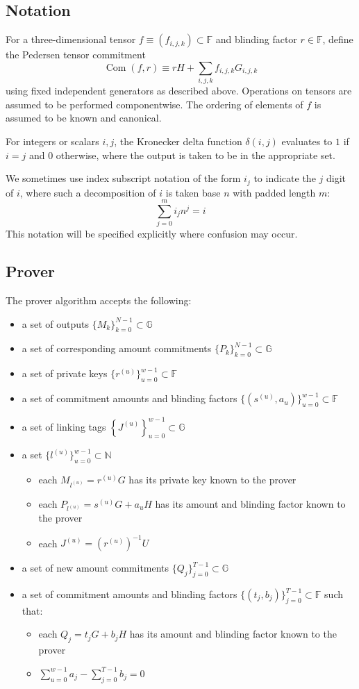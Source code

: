 \documentclass[draft]{article}
\newcommand{\G}{\mathbb{G}}
\newcommand{\F}{\mathbb{F}}
\newcommand{\N}{\mathbb{N}}
\newcommand{\com}{\operatorname{Com}}
\begin{document}
\subsection{Notation}
For a three-dimensional tensor $f \equiv (f_{i,j,k}) \subset \F$ and blinding factor $r \in \F$, define the Pedersen tensor commitment
$$\com(f,r) \equiv rH + \sum_{i,j,k} f_{i,j,k} G_{i,j,k}$$
using fixed independent generators as described above.
Operations on tensors are assumed to be performed componentwise.
The ordering of elements of $f$ is assumed to be known and canonical.

For integers or scalars $i,j$, the Kronecker delta function $\delta(i,j)$ evaluates to $1$ if $i=j$ and $0$ otherwise, where the output is taken to be in the appropriate set.

We sometimes use index subscript notation of the form $i_j$ to indicate the $j$ digit of $i$, where such a decomposition of $i$ is taken base $n$ with padded length $m$:
$$\sum_{j=0}^m i_j n^j = i$$
This notation will be specified explicitly where confusion may occur.


\subsection{Prover}
The prover algorithm accepts the following:
\begin{itemize}
\item a set of outputs $\{M_k\}_{k=0}^{N-1} \subset \G$
\item a set of corresponding amount commitments $\{P_k\}_{k=0}^{N-1} \subset \G$
\item a set of private keys $\{r^{(u)}\}_{u=0}^{w-1} \subset \F$
\item a set of commitment amounts and blinding factors $\{(s^{(u)},a_u)\}_{u=0}^{w-1} \subset \F$
\item a set of linking tags $\left\{J^{(u)}\right\}_{u=0}^{w-1} \subset \G$
\item a set $\{l^{(u)}\}_{u=0}^{w-1} \subset \N$
\begin{itemize}
\item each $M_{l^{(u)}} = r^{(u)}G$ has its private key known to the prover
\item each $P_{l^{(u)}} = s^{(u)}G + a_uH$ has its amount and blinding factor known to the prover
\item each $J^{(u)} = (r^{(u)})^{-1}U$
\end{itemize}
\item a set of new amount commitments $\{Q_j\}_{j=0}^{T-1} \subset \G$
\item a set of commitment amounts and blinding factors $\{(t_j,b_j)\}_{j=0}^{T-1} \subset \F$ such that:
\begin{itemize}
\item each $Q_j = t_jG + b_jH$ has its amount and blinding factor known to the prover
\item $\sum_{u=0}^{w-1} a_j - \sum_{j=0}^{T-1} b_j = 0$
\end{itemize}
\end{itemize}
\end{document}

